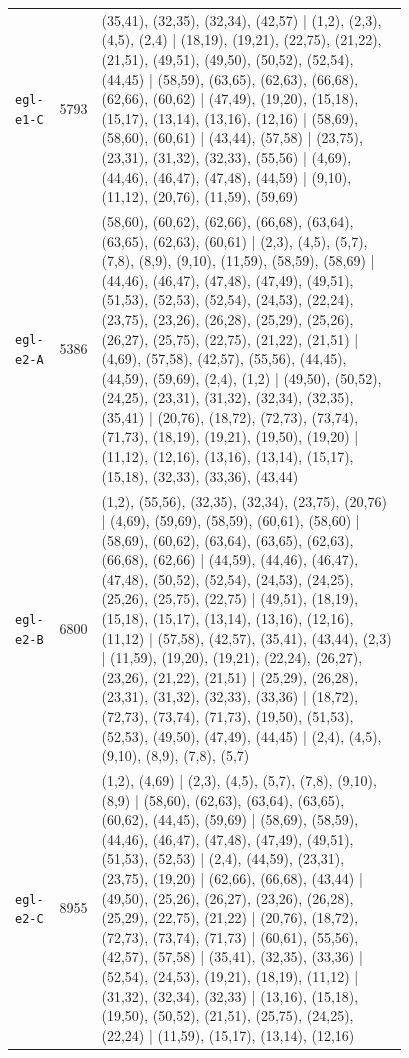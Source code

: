 \begin{landscape}
\begin{longtable}{lr>{\tiny\raggedright\arraybackslash}p{0.78\linewidth}}
\texttt{egl-e1-C} & 5793 & (35,41), (32,35), (32,34), (42,57) | (1,2), (2,3), (4,5), (2,4) | (18,19), (19,21), (22,75), (21,22), (21,51), (49,51), (49,50), (50,52), (52,54), (44,45) | (58,59), (63,65), (62,63), (66,68), (62,66), (60,62) | (47,49), (19,20), (15,18), (15,17), (13,14), (13,16), (12,16) | (58,69), (58,60), (60,61) | (43,44), (57,58) | (23,75), (23,31), (31,32), (32,33), (55,56) | (4,69), (44,46), (46,47), (47,48), (44,59) | (9,10), (11,12), (20,76), (11,59), (59,69) \\[2pt]
\texttt{egl-e2-A} & 5386 & (58,60), (60,62), (62,66), (66,68), (63,64), (63,65), (62,63), (60,61) | (2,3), (4,5), (5,7), (7,8), (8,9), (9,10), (11,59), (58,59), (58,69) | (44,46), (46,47), (47,48), (47,49), (49,51), (51,53), (52,53), (52,54), (24,53), (22,24), (23,75), (23,26), (26,28), (25,29), (25,26), (26,27), (25,75), (22,75), (21,22), (21,51) | (4,69), (57,58), (42,57), (55,56), (44,45), (44,59), (59,69), (2,4), (1,2) | (49,50), (50,52), (24,25), (23,31), (31,32), (32,34), (32,35), (35,41) | (20,76), (18,72), (72,73), (73,74), (71,73), (18,19), (19,21), (19,50), (19,20) | (11,12), (12,16), (13,16), (13,14), (15,17), (15,18), (32,33), (33,36), (43,44) \\[2pt]
\texttt{egl-e2-B} & 6800 & (1,2), (55,56), (32,35), (32,34), (23,75), (20,76) | (4,69), (59,69), (58,59), (60,61), (58,60) | (58,69), (60,62), (63,64), (63,65), (62,63), (66,68), (62,66) | (44,59), (44,46), (46,47), (47,48), (50,52), (52,54), (24,53), (24,25), (25,26), (25,75), (22,75) | (49,51), (18,19), (15,18), (15,17), (13,14), (13,16), (12,16), (11,12) | (57,58), (42,57), (35,41), (43,44), (2,3) | (11,59), (19,20), (19,21), (22,24), (26,27), (23,26), (21,22), (21,51) | (25,29), (26,28), (23,31), (31,32), (32,33), (33,36) | (18,72), (72,73), (73,74), (71,73), (19,50), (51,53), (52,53), (49,50), (47,49), (44,45) | (2,4), (4,5), (9,10), (8,9), (7,8), (5,7) \\[2pt]
\texttt{egl-e2-C} & 8955 & (1,2), (4,69) | (2,3), (4,5), (5,7), (7,8), (9,10), (8,9) | (58,60), (62,63), (63,64), (63,65), (60,62), (44,45), (59,69) | (58,69), (58,59), (44,46), (46,47), (47,48), (47,49), (49,51), (51,53), (52,53) | (2,4), (44,59), (23,31), (23,75), (19,20) | (62,66), (66,68), (43,44) | (49,50), (25,26), (26,27), (23,26), (26,28), (25,29), (22,75), (21,22) | (20,76), (18,72), (72,73), (73,74), (71,73) | (60,61), (55,56), (42,57), (57,58) | (35,41), (32,35), (33,36) | (52,54), (24,53), (19,21), (18,19), (11,12) | (31,32), (32,34), (32,33) | (13,16), (15,18), (19,50), (50,52), (21,51), (25,75), (24,25), (22,24) | (11,59), (15,17), (13,14), (12,16) \\[2pt]

\end{longtable}
\end{landscape}
